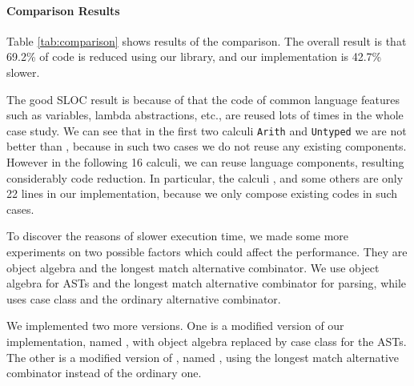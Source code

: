 \paragraph{Comparison Results}
Table \ref{tab:comparison} shows results of the comparison.
The overall result is that 69.2\% of code is reduced using our
library, and our implementation is 42.7\% slower.

The good SLOC result is because of that the code of common language features
such as variables, lambda abstractions, etc., are reused lots of times in
the whole case study. We can see that in the first two calculi
\lstinline{Arith} and \lstinline{Untyped} we are not better than \ilyaimpl{}, because in such two cases we do not reuse any existing
components. However in the following 16 calculi, we can reuse
language components, resulting considerably code reduction. In particular,
the calculi ,  and some others are only 22 lines
in our implementation, because we only compose existing codes in such cases.

To discover the reasons of slower execution time, we made some more experiments
on two possible factors which could affect the performance.
They are object algebra and the longest match alternative combinator.
We use object algebra for ASTs and the longest match alternative combinator \inlinecode{|||} for parsing,
while \ilyaimpl{} uses case class and the ordinary alternative combinator.

We implemented two more versions. One is a modified version of our implementation, named \ourclass{}, with object algebra replaced by case class for the ASTs.
The other is a modified version of \ilyaimpl{}, named \ilyalongest{}, using the longest match alternative combinator instead of the ordinary one.

